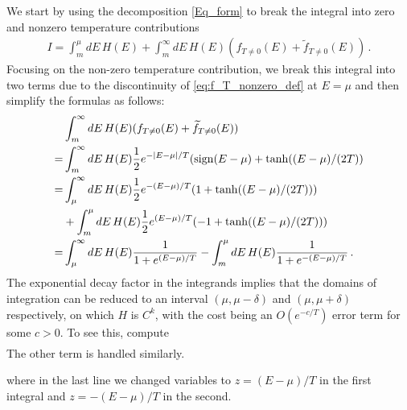\documentclass[sn-mathphys,Numbered]{sn-jnl}
\begin{document}
We start by using the decomposition \eqref{Eq_form}  to break the integral into zero and nonzero temperature contributions
\begin{align}
   I= \int_m^\mu dE\, H(E) +\int_m^\infty dE\, H(E) (f_{T\neq 0}(E)+\widetilde{f}_{T\neq 0}(E))\,.
\end{align}
Focusing on the non-zero temperature contribution,  we break this integral into two terms due to the discontinuity of \eqref{eq:f_T_nonzero_def} at $E=\mu$ and then simplify the formulas as follows:
\begin{align}
   &\int_m^\infty dE\,H(E) (f_{T\neq 0}(E)+\widetilde{f}_{T\neq 0}(E))\\
    =  &\int_m^\infty dE\, H(E) \frac{1}{2}e^{-|E-\mu|/T}(\mathrm{sign}(E-\mu)+\tanh((E-\mu)/(2T))\notag\\
=&\int_\mu^\infty dE\, H(E) \frac{1}{2}e^{-(E-\mu)/T}(1+\tanh((E-\mu)/(2T)))\notag\\
&+\int_m^\mu dE\,H(E) \frac{1}{2}e^{(E-\mu)/T}(-1+\tanh((E-\mu)/(2T)))\notag\\
=&\int_\mu^\infty dE\, H(E)  \frac{1}{1+e^{(E-\mu)/T}}-\int_m^\mu dE\,H(E) \frac{1}{1+e^{-(E-\mu)/T}}\,.
\end{align}
The exponential decay factor in the integrands implies that the domains of integration can be reduced to an interval $(\mu,\mu-\delta)$ and $(\mu,\mu+\delta)$ respectively, on which $H$ is $C^k$, with the cost being an $O(e^{-c/T})$ error term for some $c>0$.  To see this, compute
\begin{align}
    
\end{align}
The other term is handled similarly.

where in the last line we changed variables to $z=(E-\mu)/T$ in the first integral and $z=-(E-\mu)/T$ in the second.
\end{document}
